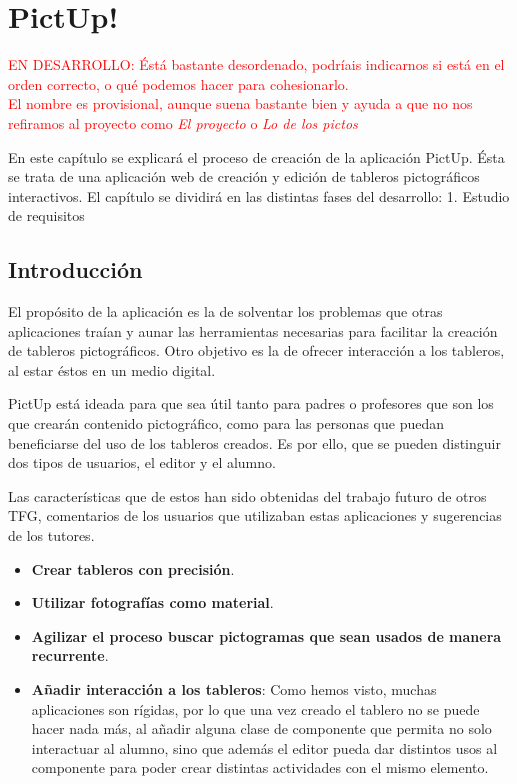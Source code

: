 \chapter{PictUp!}
\label{cap:introduccion}


\textcolor{red}{EN DESARROLLO: Éstá bastante desordenado, podríais indicarnos si está en el orden correcto, o qué podemos hacer para cohesionarlo. \\ El nombre es provisional, aunque suena bastante bien y ayuda a que no nos refiramos al proyecto como \textit{El proyecto} o \textit{Lo de los pictos}}



\begin{resumen}

	
	
	En este capítulo se explicará el proceso de creación de la aplicación PictUp. Ésta se trata de una aplicación web de creación y edición de tableros pictográficos interactivos. El capítulo se dividirá en las distintas fases del desarrollo: 1. Estudio de requisitos 
	
\end{resumen}

\label{cap1:sec:Motivacion}


\section{Introducción}

El propósito de la aplicación es la de solventar los problemas que otras aplicaciones traían y aunar las herramientas necesarias para facilitar la creación de tableros pictográficos. Otro objetivo es la de ofrecer interacción a los tableros, al estar éstos en un medio digital. 

PictUp está ideada para que sea útil tanto para padres o profesores que son los que crearán contenido pictográfico, como para las personas que puedan beneficiarse del uso de los tableros creados. Es por ello, que se pueden distinguir dos tipos de usuarios, el editor y el alumno. 

Las características que de estos han sido obtenidas del trabajo futuro de otros TFG, comentarios de los usuarios que utilizaban estas aplicaciones y sugerencias de los tutores.
\begin{itemize}
	\item \textbf{Crear tableros con precisión}.
	\item \textbf{Utilizar fotografías como material}.
	\item \textbf{Agilizar el proceso buscar pictogramas que sean usados de manera recurrente}.
	\item \textbf{Añadir interacción a los tableros}: Como hemos visto, muchas aplicaciones son rígidas, por lo que una vez creado el tablero no se puede hacer nada más, al añadir alguna clase de componente que permita no solo interactuar al alumno, sino que además el editor pueda dar distintos usos al componente para poder crear distintas actividades con el mismo elemento.
\end{itemize}



